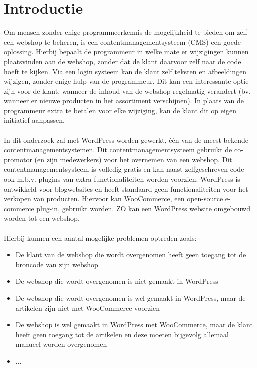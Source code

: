 
\section{Introductie}%
\label{sec:introductie}

Om mensen zonder enige programmeerkennis de mogelijkheid te bieden om zelf een webshop te beheren, is een contentmanagementsysteem (CMS) een goede oplossing. Hierbij bepaalt de programmeur in welke mate er wijzigingen
kunnen plaatsvinden aan de webshop, zonder dat de klant daarvoor zelf naar de code hoeft te kijken. Via een login systeem kan de klant zelf teksten en afbeeldingen wijzigen, zonder enige hulp van de programmeur. 
Dit kan een interessante optie zijn voor de klant, wanneer de inhoud van de webshop regelmatig verandert (bv. wanneer
er nieuwe producten in het assortiment verschijnen). In plaats van de programmeur extra te betalen
voor elke wijziging, kan de klant dit op eigen initiatief aanpassen.
\\\\
In dit onderzoek zal met WordPress worden gewerkt, één van de meest bekende contentmanagementsystemen.
Dit contentmanagementsysteem gebruikt de co-promotor (en zijn medewerkers) voor het overnemen van een webshop.
Dit contentmanagementsysteem is volledig gratis en kan naast zelfgeschreven code ook m.b.v. plugins van extra functionaliteiten worden voorzien. WordPress is ontwikkeld voor blogwebsites en heeft standaard geen functionaliteiten voor het verkopen van producten. Hiervoor kan WooCommerce, een open-source e-commerce plug-in, gebruikt worden. ZO kan een WordPress website omgebouwd worden tot een webshop. 
\\\\
Hierbij kunnen een aantal mogelijke problemen optreden zoals:
\begin{itemize}
    \item De klant van de webshop die wordt overgenomen heeft geen toegang tot de broncode van zijn webshop
    \item De webshop die wordt overgenomen is niet gemaakt in WordPress
    \item De webshop die wordt overgenomen is wel gemaakt in WordPress, maar de artikelen zijn niet met WooCommerce voorzien
    \item De webshop is wel gemaakt in WordPress met WooCommerce, maar de klant heeft geen toegang tot de artikelen en deze moeten bijgevolg allemaal manueel worden overgenomen
    \item ...
\end{itemize}

